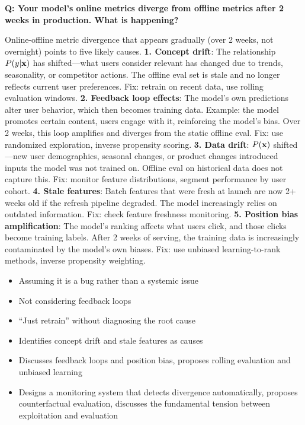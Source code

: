 \begin{interviewq}
\textbf{Q: Your model's online metrics diverge from offline metrics after 2 weeks in production. What is happening?}

 \quad {} \quad \badgefreq{\freqhigh}

\stronganswer Online-offline metric divergence that appears gradually (over 2 weeks, not overnight) points to five likely causes. \textbf{1. Concept drift}: The relationship $P(y|\mathbf{x})$ has shifted---what users consider relevant has changed due to trends, seasonality, or competitor actions. The offline eval set is stale and no longer reflects current user preferences. Fix: retrain on recent data, use rolling evaluation windows. \textbf{2. Feedback loop effects}: The model's own predictions alter user behavior, which then becomes training data. Example: the model promotes certain content, users engage with it, reinforcing the model's bias. Over 2 weeks, this loop amplifies and diverges from the static offline eval. Fix: use randomized exploration, inverse propensity scoring. \textbf{3. Data drift}: $P(\mathbf{x})$ shifted---new user demographics, seasonal changes, or product changes introduced inputs the model was not trained on. Offline eval on historical data does not capture this. Fix: monitor feature distributions, segment performance by user cohort. \textbf{4. Stale features}: Batch features that were fresh at launch are now 2+ weeks old if the refresh pipeline degraded. The model increasingly relies on outdated information. Fix: check feature freshness monitoring. \textbf{5. Position bias amplification}: The model's ranking affects what users click, and those clicks become training labels. After 2 weeks of serving, the training data is increasingly contaminated by the model's own biases. Fix: use unbiased learning-to-rank methods, inverse propensity weighting.

\redflags
\begin{itemize}
    \item Assuming it is a bug rather than a systemic issue
    \item Not considering feedback loops
    \item ``Just retrain'' without diagnosing the root cause
\end{itemize}


\goodgreat
\begin{itemize}
    \item {} Identifies concept drift and stale features as causes
    \item {} Discusses feedback loops and position bias, proposes rolling evaluation and unbiased learning
    \item {} Designs a monitoring system that detects divergence automatically, proposes counterfactual evaluation, discusses the fundamental tension between exploitation and evaluation
\end{itemize}


\end{interviewq}
